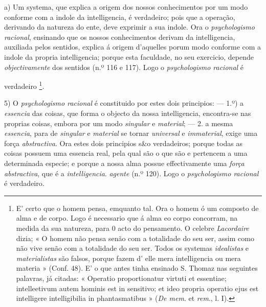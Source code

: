 

a) Um systema, que explica a origem dos nossos conhecimentos por um modo conforme com a indole da intelligencia, é verdadeiro; pois que a operação, derivando da natureza do ente, deve exprimir a sua indole. Ora o \emph{psychologismo racional},   ensinando que os nossos conhecimentos derivam da intelligencia, auxiliada pelos sentidos, explica á origem d'aquelles porum modo conforme com a indole da propria intelligencia; porque esta faculdade, no seu exercicio, depende \emph{objectivamente} dos sentidos (n.º 116 e 117). Logo o \emph{psychologismo racional} é

verdadeiro \footnote{E' certo que o homem pensa, emquanto tal. Ora o homem ó um composto de alma e de corpo. Logo é necessario que á alma eo corpo concorram, na medida da sua natureza, para 0 acto do pensamento. O celebre \emph{Lacordaire} dizia; « O homem não pensa senão com a totalidade do seu ser, assim como não vive senão com a totalidade do seu ser. Todos os systemas \emph{idealistas} e \emph{materialistas} são falsos, porque fazem d' elle mera intelligencia ou mera materia » (Conf. 48). E' o que antes tinha ensinado S. Thomaz nas seguintes palavras, já citadas: « Operatio proportionatur virtuti et essentiae; intelleetivum autem hominis est in sensitivo; et ideo propria operatio ejus est intelligere intelligibilia in phantasmatibus » (\emph{De mem}. et \emph{rem}., l. I).}.

5) O \emph{psychologismo racional} é constituido por estes dois principios: --- 1.º) a \emph{essencia} das coisas, que forma o objecto da nossa intelligencia, encontra-se nas proprias coisas, embora por um modo \emph{singular} e \emph{material}; --- 2. a mesma \emph{essencia}, para de \emph{singular} e \emph{material} se tornar \emph{universal} e \emph{immaterial}, exige uma força \emph{abstractiva}. Ora estes dois principios s\&o verdadeiros; porque todas as coisas possuem uma essencia real, pela qual são o que são e pertencem a uma determinada especie; e porque a nossa alma possue effectivamente uma \emph{força abstractiva}, que é a \emph{intelligencia}. \emph{agente} (n.º 120). Logo o \emph{psychologismo racional} é verdadeiro.

